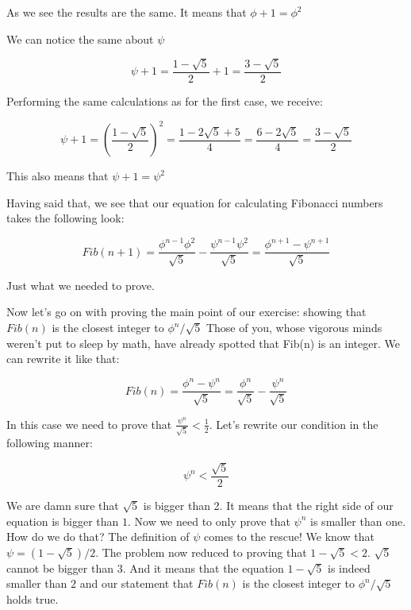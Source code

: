 As we see the results are the same. It means that $\phi+1 = \phi^2$

We can notice the same about $\psi$

\begin{equation}
	\psi+1 = \frac{1 - \sqrt5} {2} + 1 = \frac {3 - \sqrt5} {2}
\end{equation}

Performing the same calculations as for the first case, we receive:

\begin{equation}
	\psi+1 = \left(\frac {1 - \sqrt5} {2}\right)^2 = \frac {1 - 2\sqrt5 + 5} {4} = \frac {6 - 2\sqrt5} {4} = \frac {3 - \sqrt5} {2}
\end{equation}

This also means that $\psi+1 = \psi^2$

Having said that, we see that our equation for calculating Fibonacci numbers takes the following look:

\begin{equation}
	Fib(n+1) = \frac {\phi^{n-1}\phi^2} {\sqrt5} - \frac{\psi^{n-1}\psi^2} {\sqrt5} = \frac {\phi^{n+1} - \psi^{n+1}} {\sqrt5}
\end{equation}

Just what we needed to prove.

Now let's go on with proving the main point of our exercise: showing that $Fib(n)$ is the closest integer to $\phi^n / \sqrt5$ Those of you, whose vigorous minds weren't put to sleep by math, have already spotted that Fib(n) is an integer. We can rewrite it like that:

\begin{equation}
	Fib(n) = \frac {\phi^n - \psi^n} {\sqrt5} = \frac {\phi^n} {\sqrt5} - \frac{\psi^n} {\sqrt5}
\end{equation}

In this case we need to prove that $\frac{\psi^n} {\sqrt5} < \frac {1} {2}$. Let's rewrite our condition in the following manner:

\begin{equation}
	\psi^n < \frac {\sqrt5} {2}
\end{equation}

We are damn sure that $\sqrt5$ is bigger than 2. It means that the right side of our equation is bigger than $1$. Now we need to only prove that $\psi^n$ is smaller than one. How do we do that? The definition of $\psi$ comes to the rescue! We know that $\psi=(1-\sqrt5) / 2$. The problem now reduced to proving that $1 - \sqrt5 < 2$. $\sqrt5$ cannot be bigger than $3$. And it means that the equation $1 - \sqrt5$ is indeed smaller than $2$ and our statement that $Fib(n)$ is the closest integer to $\phi^n / \sqrt5$ holds true.
